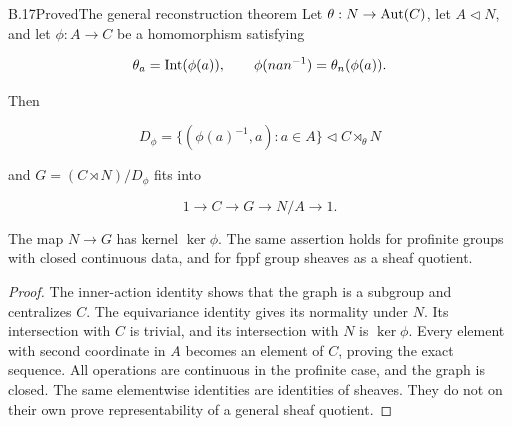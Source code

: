 \begin{statement}{B.17}{Proved}{The general reconstruction theorem}
Let $\theta:N\to\operatorname{Aut}(C)$, let $A\triangleleft N$, and let
$\phi:A\to C$ be a homomorphism satisfying

$$
\theta_a=\operatorname{Int}(\phi(a)),\qquad
 \phi(nan^{-1})=\theta_n(\phi(a)).
$$

Then

$$
D_\phi=\{(\phi(a)^{-1},a):a\in A\}
 \triangleleft C\rtimes_\theta N
$$

and $G=(C\rtimes N)/D_\phi$ fits into

$$
1\to C\to G\to N/A\to1.
$$

The map $N\to G$ has kernel $\ker\phi$.
The same assertion holds for profinite groups with closed
continuous data, and for fppf group sheaves as a sheaf quotient.
\end{statement}
\begin{proof}
The inner-action identity shows that the graph is a subgroup
and centralizes $C$. The equivariance identity gives its
normality under $N$. Its intersection with $C$ is trivial,
and its intersection with $N$ is $\ker\phi$.
Every element with second coordinate in $A$ becomes an
element of $C$, proving the exact sequence.
All operations are continuous in the profinite case, and
the graph is closed. The same elementwise identities are
identities of sheaves. They do not on their own prove
representability of a general sheaf quotient.
\end{proof}

